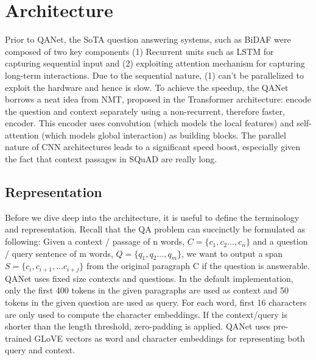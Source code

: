 \documentclass{article}
\begin{document}
\section{Architecture}
Prior to QANet, the SoTA question answering systems, such as BiDAF \cite{seo2016bidirectional} were composed of two key components (1) Recurrent units such as LSTM for capturing sequential input and (2) exploiting attention mechanism for capturing long-term interactions.  Due to the sequential nature, (1) can’t be parallelized to exploit the hardware and hence is slow. To achieve the speedup, the QANet borrows a neat idea from NMT, proposed in the Transformer\cite{vaswani2017attention} architecture: encode the question and context separately using a non-recurrent, therefore faster, encoder. This encoder uses convolution (which models the local features) and self-attention (which models global interaction) as building blocks. The parallel nature of CNN architectures leads to a significant speed boost, especially given the fact that context passages in SQuAD are really long.

\subsection{Representation}
Before we dive deep into the architecture, it is useful to define the terminology and representation. Recall that the QA problem can succinctly be formulated as following: Given 
	a context / passage of n words, $C = \{c_1,c_2...,c_n\}$
	and a question / query sentence of m words, $Q = \{q_1,q_2...,q_m\}$,
we want to output a span $S=\{c_i,c_{{i+1}},...c_{{i+j}}\}$ from the original paragraph C if the question is answerable. QANet uses fixed size contexts and questions. In the default implementation, only the first 400 tokens in the given paragraphs are used as context and 50 tokens in the given question are used as  query. For each word, first 16 characters are only used to compute the character embeddings. If the context/query is shorter than the length threshold, zero-padding is applied. QANet uses pre-trained GLoVE vectors as word and character embeddings for representing both query and context. 
\end{document}
